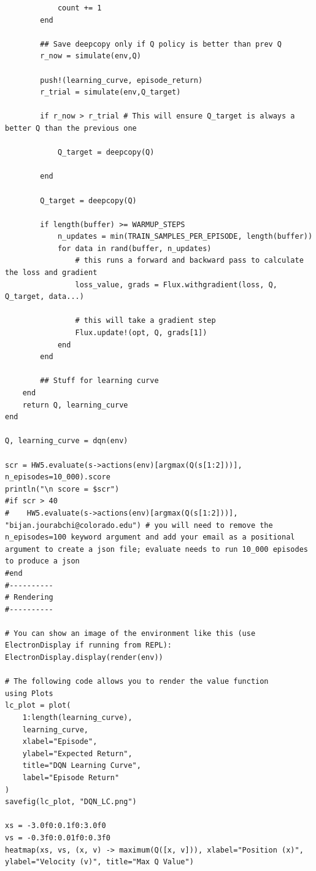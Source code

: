 \documentclass[11pt]{article}
\begin{document}
\begin{lstlisting}
            count += 1
        end
        
        ## Save deepcopy only if Q policy is better than prev Q
        r_now = simulate(env,Q)
        
        push!(learning_curve, episode_return)
        r_trial = simulate(env,Q_target)

        if r_now > r_trial # This will ensure Q_target is always a better Q than the previous one
            
            Q_target = deepcopy(Q)

        end
        
        Q_target = deepcopy(Q)

        if length(buffer) >= WARMUP_STEPS
            n_updates = min(TRAIN_SAMPLES_PER_EPISODE, length(buffer))
            for data in rand(buffer, n_updates)
                # this runs a forward and backward pass to calculate the loss and gradient
                loss_value, grads = Flux.withgradient(loss, Q, Q_target, data...)

                # this will take a gradient step
                Flux.update!(opt, Q, grads[1])
            end
        end

        ## Stuff for learning curve
    end
    return Q, learning_curve
end

Q, learning_curve = dqn(env)

scr = HW5.evaluate(s->actions(env)[argmax(Q(s[1:2]))], n_episodes=10_000).score
println("\n score = $scr")
#if scr > 40
#    HW5.evaluate(s->actions(env)[argmax(Q(s[1:2]))], "bijan.jourabchi@colorado.edu") # you will need to remove the n_episodes=100 keyword argument and add your email as a positional argument to create a json file; evaluate needs to run 10_000 episodes to produce a json
#end
#----------
# Rendering
#----------

# You can show an image of the environment like this (use ElectronDisplay if running from REPL):
ElectronDisplay.display(render(env))

# The following code allows you to render the value function
using Plots
lc_plot = plot(
    1:length(learning_curve),
    learning_curve,
    xlabel="Episode",
    ylabel="Expected Return",
    title="DQN Learning Curve",
    label="Episode Return"
)
savefig(lc_plot, "DQN_LC.png")

xs = -3.0f0:0.1f0:3.0f0
vs = -0.3f0:0.01f0:0.3f0
heatmap(xs, vs, (x, v) -> maximum(Q([x, v])), xlabel="Position (x)", ylabel="Velocity (v)", title="Max Q Value")

\end{lstlisting}
\end{document}
